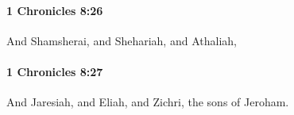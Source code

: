 		\paragraph{1 Chronicles 8:26} %
			\label{1CHRONICLES-8-26}

			And Shamsherai, and Shehariah, and Athaliah,


		\paragraph{1 Chronicles 8:27} %
			\label{1CHRONICLES-8-27}

			And Jaresiah, and Eliah, and Zichri, the sons of Jeroham.


